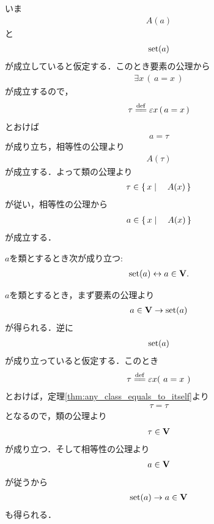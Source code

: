 	\begin{sketch}
		いま
		\begin{align}
			A(a)
		\end{align}
		と
		\begin{align}
			\operatorname*{set} (a)
		\end{align}
		が成立していると仮定する．このとき要素の公理から
		\begin{align}
			\exists x\, (\, a = x\, )
		\end{align}
		が成立するので，
		\begin{align}
			\tau \defeq \varepsilon x\, (\, a = x\, )
		\end{align}
		とおけば
		\begin{align}
			a = \tau
		\end{align}
		が成り立ち，相等性の公理より
		\begin{align}
			A(\tau)
		\end{align}
		が成立する．よって類の公理より
		\begin{align}
			\tau \in \left\{\, x \mid \quad A(x)\, \right\}
		\end{align}
		が従い，相等性の公理から
		\begin{align}
			a \in \left\{\, x \mid \quad A(x)\, \right\}
		\end{align}
		が成立する．
		\QED
	\end{sketch}
	
	\begin{screen}
		\begin{thm}
		\label{thm:V_is_the_whole_of_sets}
			$a$を類とするとき次が成り立つ:
			\begin{align}
				\operatorname*{set} (a) \leftrightarrow a \in \mathbf{V}.
			\end{align}
		\end{thm}
	\end{screen}
	
	\begin{prf}
		$a$を類とするとき，まず要素の公理より
		\begin{align}
			a \in \mathbf{V} \rightarrow \operatorname*{set} (a)
		\end{align}
		が得られる．逆に
		\begin{align}
			\operatorname*{set} (a)
		\end{align}
		が成り立っていると仮定する．このとき
		\begin{align}
			\tau \defeq \varepsilon x (\ a = x\ )
		\end{align}
		とおけば，定理\ref{thm:any_class_equals_to_itself}より
		\begin{align}
			\tau = \tau
		\end{align}
		となるので，類の公理より
		\begin{align}
			\tau \in \mathbf{V}
		\end{align}
		が成り立つ．そして相等性の公理より
		\begin{align}
			a \in \mathbf{V}
		\end{align}
		が従うから
		\begin{align}
			\operatorname*{set} (a) \rightarrow a \in \mathbf{V}
		\end{align}
		も得られる．
		\QED
	\end{prf}
	
